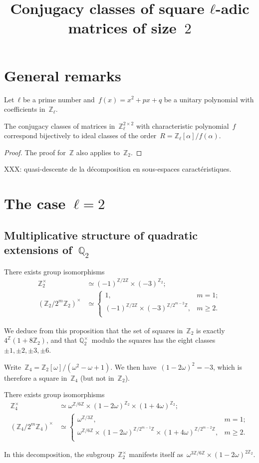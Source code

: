 \documentclass{article}
\begin{document}
\title{Conjugacy classes of square $ℓ$-adic matrices of size~$2$}

\section{General remarks}

Let~$ℓ$ be a prime number and~$f(x) = x^2 + px + q$ be a unitary
polynomial with coefficients in~$ℤ_{ℓ}$.

\begin{prop}
The conjugacy classes of matrices in~$ℤ_{ℓ}^{2×2}$ with characteristic
polynomial~$f$ correspond bijectively to ideal classes of the order~$R =
ℤ_{ℓ}[α] / f(α)$.
\end{prop}

\begin{proof}
The proof for~$ℤ$ also applies to~$ℤ_2$.
\end{proof}

XXX: quasi-descente de la décomposition en sous-espaces caractéristiques.

\section{The case~$ℓ = 2$}


\subsection{Multiplicative structure of quadratic extensions of~$ℚ_2$}

\begin{prop}
There exists group isomorphisms
\begin{align*}
ℤ_2^{×} &≃ (-1)^{ℤ/2ℤ} × (-3)^{ℤ_2};\\
(ℤ_2/2^m ℤ_2)^{×} &≃ \begin{cases} 1, & m = 1;\\
(-1)^{ℤ/2ℤ} × (-3)^{ℤ/2^{m-2}ℤ},& m ≥ 2.\\\end{cases}
\end{align*}
\end{prop}

We deduce from this proposition that the set of squares in~$ℤ_2$ is
exactly~$4^{ℤ} (1 + 8 ℤ_2)$, and that $ℚ_2^{×}$~modulo the squares has
the eight classes~$±1, ±2, ±3, ±6$.

Write~$ℤ_4 = ℤ_2[ω]/(ω^2-ω+1)$. We then have~$(1-2ω)^2 = -3$, which is
therefore a square in~$ℤ_4$ (but not in~$ℤ_2$).

\begin{prop}
There exists group isomorphisms
\begin{align*}
ℤ_4^{×} &≃ ω^{ℤ/6ℤ} × (1 - 2 ω)^{ℤ_2} × (1 + 4 ω)^{ℤ_2};\\
(ℤ_4/2^m ℤ_4)^{×} &≃ \begin{cases} ω^{ℤ/3ℤ},& m = 1;\\
ω^{ℤ/6ℤ} × (1-2ω)^{ℤ/2^{m-1}ℤ} × (1+4ω)^{ℤ/2^{m-2}ℤ}, & m ≥ 2.\\ \end{cases}
\end{align*}
\end{prop}
In this decomposition, the subgroup~$ℤ_2^{×}$ manifests itself
as~$ω^{3ℤ/6ℤ} × (1-2ω)^{2 ℤ_2}$.
\end{document}
